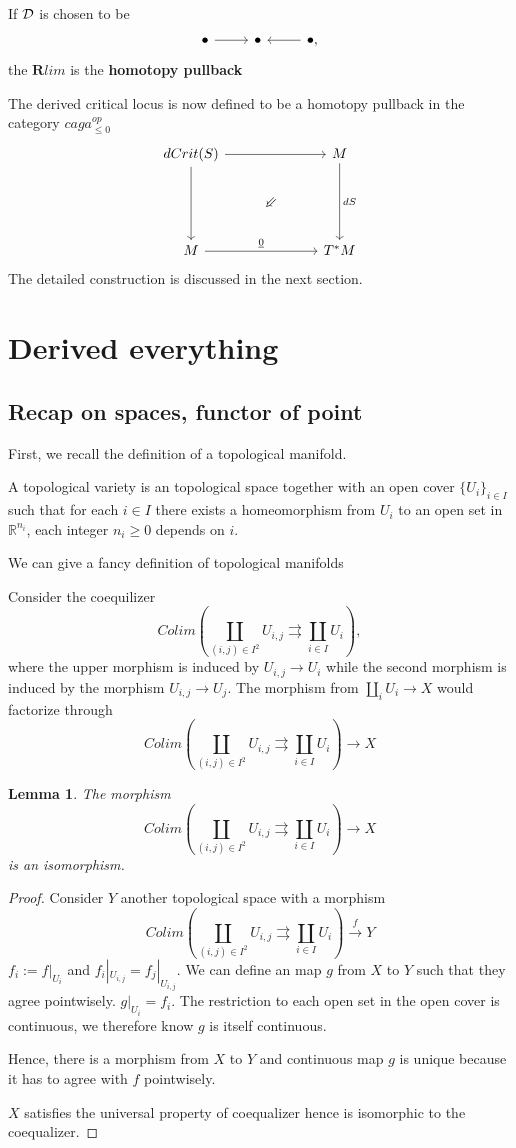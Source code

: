 \documentclass[11pt]{article}
\newcommand{\Swarrow}{\mathbin{\rotatebox[origin=c]{45}{$\Leftarrow$}}}
\newtheorem{lemma}[thm]{Lemma}
\newcommand{\reals}{\mathbb R}
\newcommand{\cald}{{\cal D}}
\newcommand{\lrta}{\longrightarrow}
\begin{document}
If $\cald$ is chosen to be 
$$
\begin{tikzcd}
\bullet \arrow[r] & \bullet & \bullet \arrow[l],
\end{tikzcd}
$$
the $\mathbf{R}lim$ is the \textbf{homotopy pullback}

The derived critical locus is now defined to be a homotopy pullback in the category $caga_{\leq0}^{op}$
$$
\begin{tikzcd}
dCrit(S) \arrow[rr] \arrow[dd] &  & M \arrow[dd, "dS"] \\
 & \Swarrow &  \\
M \arrow[rr, "\underline{0}"] &  & T^*M
\end{tikzcd}
$$
The detailed construction is discussed in the next section.

\section{Derived everything}
\subsection{Recap on spaces, functor of point}
First, we recall the definition of a topological manifold. 

A topological variety is an topological space together with an open cover $\{U_i\}_{i\in I}$ such that for each $i\in I$ there exists a homeomorphism from $U_i$ to an open set in $\reals^{n_i}$, each integer $n_i\geq 0$ depends on $i$.

We can give a fancy definition of topological manifolds

Consider the coequilizer
$$
Colim\left(\coprod_{(i,j)\in I^2} U_{i,j}\rightrightarrows \coprod_{i\in I}U_i\right),
$$
where the upper morphism is induced by $U_{i,j}\lrta U_i$ while the second morphism is induced by the morphism $U_{i,j}\lrta U_j$.
The morphism from $\coprod_i U_i\lrta X$ would factorize through 
$$
Colim\left(\coprod_{(i,j)\in I^2}U_{i,j}\rightrightarrows \coprod_{i\in I}U_i\right)\lrta X
$$
\begin{lemma}
The morphism 
$$
Colim\left(\coprod_{(i,j)\in I^2}U_{i,j}\rightrightarrows \coprod_{i\in I}U_i\right)\lrta X
$$
is an isomorphism.
\end{lemma}
\begin{proof}
Consider $Y$ another topological space with a morphism
$$
Colim\left(\coprod_{(i,j)\in I^2}U_{i,j}\rightrightarrows \coprod_{i\in I}U_i\right)\overset{f}{\lrta} Y
$$
$f_i:=f|_{U_{i}}$ and $f_i|_{U_{i,j}}=f_j|_{U_{i,j}}$. We can define an map $g$ from $X$ to $Y$ such that they agree pointwisely. $g|_{U_i}=f_i$. The restriction to each open set in the open cover is continuous, we therefore know $g$ is itself continuous. 

Hence, there is a morphism from $X$ to $Y$ and continuous map $g$ is unique because it has to agree with $f$ pointwisely.

$X$ satisfies the universal property of coequalizer hence is isomorphic to the coequalizer.
\end{proof}
\end{document}
